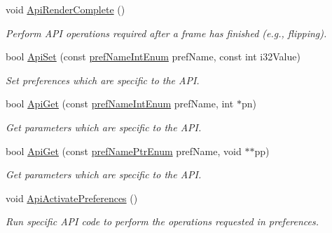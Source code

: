 \begin{DoxyCompactItemize}
void \hyperlink{class_p_v_r_shell_init_a8c8669db0f2d908cc4cc1f1bc18301e5}{Api\+Render\+Complete} ()
\begin{DoxyCompactList}\small\item\em Perform A\+P\+I operations required after a frame has finished (e.\+g., flipping). \end{DoxyCompactList}\item 
bool \hyperlink{class_p_v_r_shell_init_a0f43c9701f9c22dd61cffb73b73fc1a2}{Api\+Set} (const \hyperlink{_p_v_r_shell_8h_a78ec4653192043575302f1448ae7054e}{pref\+Name\+Int\+Enum} pref\+Name, const int i32\+Value)
\begin{DoxyCompactList}\small\item\em Set preferences which are specific to the A\+P\+I. \end{DoxyCompactList}\item 
bool \hyperlink{class_p_v_r_shell_init_a6959cf3fd666f3e9500657db44509daf}{Api\+Get} (const \hyperlink{_p_v_r_shell_8h_a78ec4653192043575302f1448ae7054e}{pref\+Name\+Int\+Enum} pref\+Name, int $\ast$pn)
\begin{DoxyCompactList}\small\item\em Get parameters which are specific to the A\+P\+I. \end{DoxyCompactList}\item 
bool \hyperlink{class_p_v_r_shell_init_aa65767387b24424d7a84735003850dc5}{Api\+Get} (const \hyperlink{_p_v_r_shell_8h_a946b110b552f1d833e359e6517647330}{pref\+Name\+Ptr\+Enum} pref\+Name, void $\ast$$\ast$pp)
\begin{DoxyCompactList}\small\item\em Get parameters which are specific to the A\+P\+I. \end{DoxyCompactList}\item 
void \hyperlink{class_p_v_r_shell_init_a3be5de00af1686889046d6d94e554f36}{Api\+Activate\+Preferences} ()
\begin{DoxyCompactList}\small\item\em Run specific A\+P\+I code to perform the operations requested in preferences. \end{DoxyCompactList}\end{DoxyCompactItemize}
